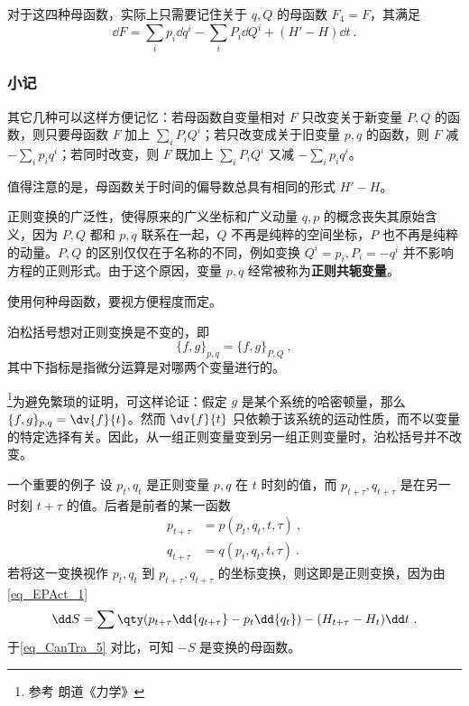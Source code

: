 对于这四种母函数，实际上只需要记住关于 $q,Q$ 的母函数 $F_4=F$，其满足
\begin{equation}
\dd F=\sum_ip_i\dd q^i-\sum_iP_i\dd Q^i+(H'-H)\dd t~.
\end{equation}
\subsubsection{小记}
其它几种可以这样方便记忆：若母函数自变量相对 $F$ 只改变关于新变量 $P,Q$ 的函数，则只要母函数 $F$ 加上 $\sum_iP_iQ^i$；若只改变成关于旧变量 $p,q$ 的函数，则 $F$ 减 $-\sum_ip_iq^i$；若同时改变，则 $F$ 既加上 $\sum_iP_iQ^i$ 又减 $-\sum_ip_iq^i$。

值得注意的是，母函数关于时间的偏导数总具有相同的形式 $H'-H$。

正则变换的广泛性，使得原来的广义坐标和广义动量 $q,p$ 的概念丧失其原始含义，因为 $P,Q$ 都和 $p,q$ 联系在一起，$Q$ 不再是纯粹的空间坐标，$P$ 也不再是纯粹的动量。$P,Q$ 的区别仅仅在于名称的不同，例如变换 $Q^i=p_i,P_i=-q^i$ 并不影响方程的正则形式。由于这个原因，变量 $p,q$ 经常被称为\textbf{正则共轭变量}。

使用何种母函数，要视方便程度而定。
\begin{theorem}{}
泊松括号想对正则变换是不变的，即
\begin{equation}
\{f,g\}_{p,q}=\{f,g\}_{P,Q}~,
\end{equation}
其中下指标是指微分运算是对哪两个变量进行的。
\end{theorem}
\footnote{参考 朗道《力学》}为避免繁琐的证明，可这样论证：假定 $g$ 是某个系统的哈密顿量，那么 $\{f,g\}_{p,q}=\dv{f}{t}$。然而 $\dv{f}{t}$ 只依赖于该系统的运动性质，而不以变量的特定选择有关。因此，从一组正则变量变到另一组正则变量时，泊松括号并不改变。
\begin{example}{一个重要的例子}
设 $p_t,q_t$ 是正则变量 $p,q$ 在 $t$ 时刻的值，而 $p_{t+\tau},q_{t+\tau}$ 是在另一时刻 $t+\tau$ 的值。后者是前者的某一函数
\begin{equation}
\begin{aligned}
p_{t+\tau}&=p(p_t,q_t,t,\tau)~,\\
q_{t+\tau}&=q(p_t,q_t,t,\tau)~.
\end{aligned}
\end{equation}
若将这一变换视作 $p_t,q_t$ 到 $p_{t+\tau},q_{t+\tau}$ 的坐标变换，则这即是正则变换，因为由\autoref{eq_EPAct_1} 
\begin{equation}
\dd S=\sum \qty(p_{t+\tau}\dd {q_{t+\tau}}-p_{t}\dd {q_{t}})-(H_{t+\tau}-H_t)\dd t~.
\end{equation}
于\autoref{eq_CanTra_5} 对比，可知 $-S$ 是变换的母函数。 

\end{example}


